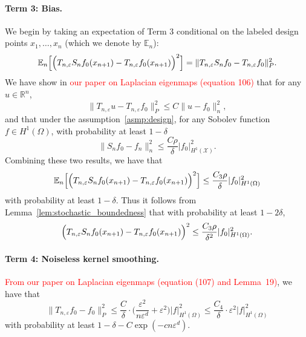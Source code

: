 \documentclass{article}
\newcommand{\Reals}{\mathbb{R}}
\newcommand{\1}{\mathbf{1}}
\newcommand{\mc}[1]{\mathcal{#1}}
\newcommand{\Ebb}{\mathbb{E}}
\theoremstyle{alden}
\theoremstyle{aldenthm}
\theoremstyle{definition}
\theoremstyle{remark}
\begin{document}
\paragraph{Term 3: Bias.}
We begin by taking an expectation of Term 3 conditional on the labeled design points $x_1,\ldots,x_n$ (which we denote by $\Ebb_n$):
\begin{equation*}
\Ebb_n\Bigl[\Bigl(T_{n,\varepsilon}S_nf_0(x_{n + 1}) - T_{n,\varepsilon}f_0(x_{n + 1})\Bigr)^2\Bigr] = \|T_{n,\varepsilon}S_nf_0 - T_{n,\varepsilon}f_0\|_P^2.
\end{equation*}
We have show in \textcolor{red}{our paper on Laplacian eigenmaps (equation 106)} that for any $u \in \Reals^n$,
\begin{equation*}
\|T_{n,\varepsilon}u - T_{n,\varepsilon}f_0\|_P^2 \leq C \|u - f_0\|_n^2,
\end{equation*}
and that under the assumption~\ref{asmp:design}, for any Sobolev function $f \in H^1(\Omega)$, with probability at least $1 - \delta$
\begin{equation*}
\|S_nf_0 -f_n\|_n^2 \leq \frac{C\rho}{\delta}|f_0|_{H^1(\mc{X})}^2.
\end{equation*}
Combining these two results, we have that
\begin{equation*}
\Ebb_n\Bigl[\Bigl(T_{n,\varepsilon}S_nf_0(x_{n + 1}) - T_{n,\varepsilon}f_0(x_{n + 1})\Bigr)^2\Bigr] \leq \frac{C_3\rho}{\delta}|f_0|_{H^1(\Omega)}^2
\end{equation*}                                                                          
with probability at least $1 - \delta$. Thus it follows from Lemma~\ref{lem:stochastic_boundedness} that with probability at least $1 - 2\delta$,
\begin{equation*}
\Bigl(T_{n,\varepsilon}S_nf_0(x_{n + 1}) - T_{n,\varepsilon}f_0(x_{n + 1})\Bigr)^2 \leq \frac{C_3\rho}{\delta^2}|f_0|_{H^1(\Omega)}^2.
\end{equation*}
              
\paragraph{Term 4: Noiseless kernel smoothing.}
\textcolor{red}{From our paper on Laplacian eigenmaps (equation (107) and Lemma~19)}, we have that
\begin{equation*}
\|T_{n,\varepsilon}f_0 - f_0\|_P^2 \leq \frac{C}{\delta} \cdot \biggl(\frac{\varepsilon^2}{n\varepsilon^d} + \varepsilon^2\biggr) |f|_{H^1(\Omega)}^2 \leq \frac{C_4}{\delta} \cdot \varepsilon^2 |f|_{H^1(\Omega)}^2
\end{equation*}
with probability at least $1 - \delta - C\exp(-cn\varepsilon^d)$. 
\end{document}
